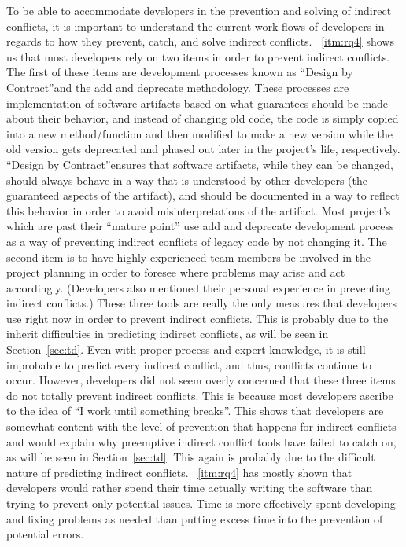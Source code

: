 \documentclass[conference]{IEEEtran}
\begin{document}
To be able to accommodate developers in the prevention and solving of indirect conflicts, it is important to understand the current
work flows of developers in regards to how they prevent, catch, and solve indirect conflicts. ~\ref{itm:rq4} shows us that most developers rely on
two items in order to prevent indirect conflicts. The first of these items are development processes known as
``Design by Contract''\texttrademark and the add and deprecate methodology. These processes are implementation of software artifacts based
on what guarantees should be made about their behavior, and instead of changing old code, the code is simply copied into a new method/function and then modified to make a new version while the old version gets deprecated and phased out later in the project's life, respectively. 
``Design by Contract''\texttrademark ensures that software artifacts, while they can be changed, should always behave in a way that is understood
by other developers (the guaranteed aspects of the artifact), and should be documented in a way to reflect this behavior in order to avoid
misinterpretations of the artifact. Most project's which are past their ``mature point''
use add and deprecate development process as a way of preventing indirect conflicts of legacy code by not changing it. 
The second item is to have highly experienced team
members be involved in the project planning in order to foresee where problems may arise and act accordingly. (Developers also mentioned
their personal experience in preventing indirect conflicts.) These three tools are really the only measures that developers use right now
in order to prevent indirect conflicts. This is probably due to the inherit difficulties in predicting indirect conflicts, as will be seen in
Section~\ref{sec:td}. Even with proper process and expert knowledge, it is still improbable to predict every indirect conflict, and thus, conflicts 
continue to occur. However, developers did not seem overly concerned that these three items do not totally prevent indirect conflicts. This
is because most developers ascribe to the idea of ``I work until something breaks''. This shows that developers are somewhat content with
the level of prevention that happens for indirect conflicts and would explain why preemptive indirect conflict tools have failed to catch on,
as will be seen in Section~\ref{sec:td}. This again is probably due to the difficult nature of predicting indirect conflicts. ~\ref{itm:rq4} has mostly
shown that developers would rather spend their time actually writing the software than trying to prevent only potential issues. Time is
more effectively spent developing and fixing problems as needed than putting excess time into the prevention of potential errors.
\end{document}

